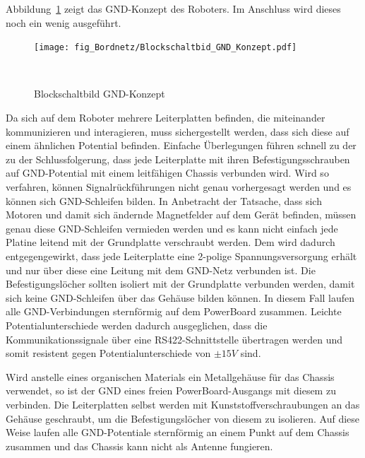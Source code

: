 \documentclass[main.tex]{subfiles} %
\begin{document}
Abbildung~\ref{fig:GND_Konzept} zeigt das GND-Konzept des Roboters. Im
Anschluss wird dieses noch ein wenig ausgeführt.
\begin{figure}[H]
    \centering
    \texttt{[image: fig\_Bordnetz/Blockschaltbid\_GND\_Konzept.pdf]}
    \caption{Blockschaltbild GND-Konzept}~\label{fig:GND_Konzept}
\end{figure}

Da sich auf dem Roboter mehrere Leiterplatten befinden, die miteinander
kommunizieren und interagieren, muss sichergestellt werden, dass sich diese auf
einem ähnlichen Potential befinden. Einfache Überlegungen führen schnell zu der
zu der Schlussfolgerung, dass jede Leiterplatte mit ihren Befestigungsschrauben
auf GND-Potential mit einem leitfähigen Chassis verbunden wird. Wird so
verfahren, können Signalrückführungen nicht genau vorhergesagt werden und es
können sich GND-Schleifen bilden. In Anbetracht der Tatsache, dass sich Motoren
und damit sich ändernde Magnetfelder auf dem Gerät befinden, müssen genau diese
GND-Schleifen vermieden werden und es kann nicht einfach jede Platine leitend
mit der Grundplatte verschraubt werden. Dem wird dadurch entgegengewirkt, dass
jede Leiterplatte eine 2-polige Spannungsversorgung erhält und nur über diese
eine Leitung mit dem GND-Netz verbunden ist. Die Befestigungslöcher sollten
isoliert mit der Grundplatte verbunden werden, damit sich keine GND-Schleifen
über das Gehäuse bilden können. In diesem Fall laufen alle GND-Verbindungen
sternförmig auf dem PowerBoard zusammen. Leichte Potentialunterschiede werden
dadurch ausgeglichen, dass die Kommunikationssignale über eine
RS422-Schnittstelle übertragen werden und somit resistent gegen
Potentialunterschiede von $\pm 15V$ sind.

Wird anstelle eines organischen Materials ein Metallgehäuse für das Chassis
verwendet, so ist der GND eines freien PowerBoard-Ausgangs mit diesem zu
verbinden. Die Leiterplatten selbst werden mit Kunststoffverschraubungen an das
Gehäuse geschraubt, um die Befestigungslöcher von diesem zu isolieren. Auf
diese Weise laufen alle GND-Potentiale sternförmig an einem Punkt auf dem
Chassis zusammen und das Chassis kann nicht als Antenne fungieren.
\end{document}
